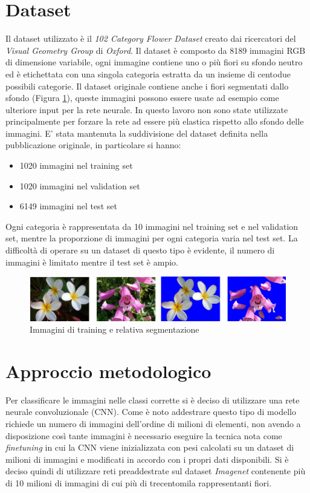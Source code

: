 \section{Dataset}
Il dataset utilizzato è il \textit{102 Category Flower Dataset} \cite{Nilsback08} creato dai ricercatori del \textit{Visual Geometry Group} di \textit{Oxford}. Il dataset è composto da 8189 immagini RGB di dimensione variabile, ogni immagine contiene uno o più fiori su sfondo neutro ed è etichettata con una singola categoria estratta da un insieme di centodue possibili categorie. Il dataset originale contiene anche i fiori segmentati dallo sfondo (Figura \ref{fig_dataset}), queste immagini possono essere usate ad esempio come ulteriore input per la rete neurale. In questo lavoro non sono state utilizzate principalmente per forzare la rete ad essere più elastica rispetto allo sfondo delle immagini.
E' stata mantenuta la suddivisione del dataset definita nella pubblicazione originale, in particolare si hanno:
\begin{itemize}
\item 1020 immagini nel training set
\item 1020 immagini nel validation set
\item 6149 immagini nel test set
\end{itemize}
Ogni categoria è rappresentata da 10 immagini nel training set e nel validation set, mentre la proporzione di immagini per ogni categoria varia nel test set.
La difficoltà di operare su un dataset di questo tipo è evidente, il numero di immagini è limitato mentre il test set è ampio.
\begin{figure}[H]
\centering	
\includegraphics[width=1.0\textwidth]{images/dataset.png} 
\caption{Immagini di training e relativa segmentazione \cite{Nilsback08}}
\label{fig_dataset}
\vspace{-7mm}
\end{figure}


\section{Approccio metodologico}
Per classificare le immagini nelle classi corrette si è deciso di utilizzare una rete neurale convoluzionale (CNN). Come è noto addestrare questo tipo di modello richiede un numero di immagini dell'ordine di milioni di elementi, non avendo a disposizione così tante immagini è necessario eseguire la tecnica nota come \textit{finetuning} in cui la CNN viene inizializzata con pesi calcolati su un dataset di milioni di immagini e modificati in accordo con i propri dati disponibili.
Si è deciso quindi di utilizzare reti preaddestrate sul dataset \textit{Imagenet} contenente più di 10 milioni di immagini di cui più di trecentomila rappresentanti fiori.
